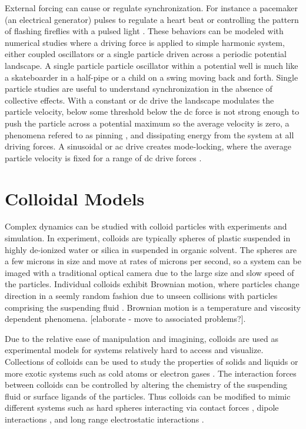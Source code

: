 \documentclass[twocolumn,preprintnumbers,amsmath,amssymb,aps,prx]{revtex4}
\begin{document}
External forcing can cause or regulate 
synchronization. %
For instance a
pacemaker (an electrical generator)
pulses to regulate a heart beat
or controlling the pattern of flashing
fireflies with a pulsed light \cite{Agrawal2013}.
These behaviors can be modeled with
numerical studies %
where
a driving force is applied to simple harmonic system,
either
coupled oscillators %
or a single particle driven across a periodic potential landscape.
A single particle particle oscillator
within a potential well is 
much like a skateboarder in a half-pipe or
a child on a swing
moving back and forth. %
Single particle studies 
are useful to understand synchronization
in the absence of collective effects.
With a constant or 
dc drive the landscape modulates 
the particle velocity, below some threshold below
the dc force is not strong enough to push the particle
across a potential maximum so the average velocity is zero,
a phenomena refered to as pinning \cite{Reichhardt2017},
and dissipating energy from the system at all driving forces.
A sinusoidal or ac drive creates mode-locking,
where the average particle velocity
is fixed for a range of dc drive forces \cite{Reichhardt2015}.

\section{Colloidal Models}
\label{sec:colloids}

Complex dynamics can be studied with
colloid particles with experiments and simulation.
In experiment, colloids are typically spheres of 
plastic suspended in
highly de-ionized water or silica in suspended in organic solvent.
The spheres are a few microns in size
and move at rates of microns per second,
so a system can be imaged
with a traditional optical camera
due to the large size and slow speed of the particles.
Individual colloids exhibit 
Brownian motion,
where particles change direction in a seemly random fashion
due to unseen 
collisions 
with particles comprising the suspending fluid \cite{}.
Brownian motion is a temperature and viscosity dependent
phenomena. \cite{}
[elaborate - move to associated problems?].

Due to the relative ease of
manipulation and imagining, 
colloids are used as experimental models
for systems relatively hard to access and visualize. 
Collections of colloids can
be used to study the properties of solids and liquids
or more exotic systems 
such as cold atoms or electron gases \cite{Grier2003}.  
The interaction forces between colloids can be controlled 
by altering the chemistry of the suspending fluid
or surface ligands of the particles.
Thus colloids can 
be modified to mimic different
systems such as hard spheres interacting via contact forces \cite{},
dipole interactions \cite{},
and long range electrostatic interactions \cite{}.
\end{document}
